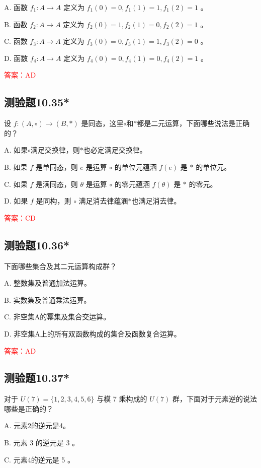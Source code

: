 \documentclass[UTF8, heading=true]{ctexart}
\begin{document}
A. 函数 $f_1: A \rightarrow A$ 定义为 $f_1(0)=0, f_1(1)=1, f_1(2)=1$ 。

B. 函数 $f_2: A \rightarrow A$ 定义为 $f_2(0)=1, f_2(1)=0, f_2(2)=1$ 。

C. 函数 $f_3: A \rightarrow A$ 定义为 $f_3(0)=0, f_3(1)=1, f_3(2)=0$ 。

D. 函数 $f_4: A \rightarrow A$ 定义为 $f_4(0)=0, f_4(1)=0, f_4(2)=1$ 。

\textcolor{red}{答案：AD}

\subsection{测验题10.35*}

设 $f:(A, \circ) \rightarrow(B, *)$ 是同态，这里$\circ$和$*$都是二元运算，下面哪些说法是正确的？

A. 如果$\circ$满足交换律，则$*$也必定满足交换律。

B. 如果 $f$ 是单同态，则 $e$ 是运算 $\circ$ 的单位元蕴涵 $f(e)$ 是 $*$ 的单位元。

C. 如果 $f$ 是满同态，则 $\theta$ 是运算 $\circ$ 的零元蕴涵 $f(\theta)$ 是 $*$ 的零元。

D. 如果 $f$ 是同构，则 $\circ$ 满足消去律蕴涵$*$也满足消去律。

\textcolor{red}{答案：CD}

\subsection{测验题10.36*}

下面哪些集合及其二元运算构成群？

A. 整数集及普通加法运算。

B. 实数集及普通乘法运算。

C. 非空集A的幂集及集合交运算。

D. 非空集A上的所有双函数构成的集合及函数复合运算。

\textcolor{red}{答案：AD}

\subsection{测验题10.37*}

对于 $U(7)=\{1,2,3,4,5,6\}$ 与模 7 乘构成的 $U(7)$ 群，下面对于元素逆的说法哪些是正确的？

A. 元素2的逆元是4。

B. 元素 3 的逆元是 3 。

C. 元素4的逆元是 5 。
\end{document}
